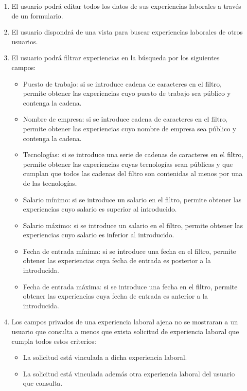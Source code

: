 \documentclass[a4paper, 12pt]{book}
\begin{document}
\begin{enumerate}
        \item El usuario podrá editar todos los datos de sus experiencias laborales a través de un formulario.
        \item El usuario dispondrá de una vista para buscar experiencias laborales de otros usuarios.
        \item El usuario podrá filtrar experiencias en la búsqueda por los siguientes campos:
        \begin{itemize}
            \item Puesto de trabajo: si se introduce cadena de caracteres en el filtro, permite obtener las experiencias cuyo puesto de trabajo sea público y contenga la cadena.
            \item Nombre de empresa: si se introduce cadena de caracteres en el filtro, permite obtener las experiencias cuyo nombre de empresa sea público y contenga la cadena.
            \item Tecnologías: si se introduce una serie de cadenas de caracteres en el filtro, permite obtener las experiencias cuyas tecnologías sean públicas y que cumplan que todos las cadenas del filtro son contenidas al menos por una de las tecnologías.
            \item Salario mínimo: si se introduce un salario en el filtro, permite obtener las experiencias cuyo salario es superior al introducido.
            \item Salario máximo: si se introduce un salario en el filtro, permite obtener las experiencias cuyo salario es inferior al introducido.
            \item Fecha de entrada mínima: si se introduce una fecha en el filtro, permite obtener las experiencias cuya fecha de entrada es posterior a la introducida.
            \item Fecha de entrada máxima: si se introduce una fecha en el filtro, permite obtener las experiencias cuya fecha de entrada es anterior a la introducida.
        \end{itemize}
        \item Los campos privados de una experiencia laboral ajena no se mostraran a un usuario que consulta a menos que exista solicitud de experiencia laboral que cumpla todos estos criterios:
        \begin{itemize}
            \item La solicitud está vinculada a dicha experiencia laboral.
            \item La solicitud está vinculada además otra experiencia laboral del usuario que consulta.

\end{itemize}
\end{enumerate}
\end{document}
